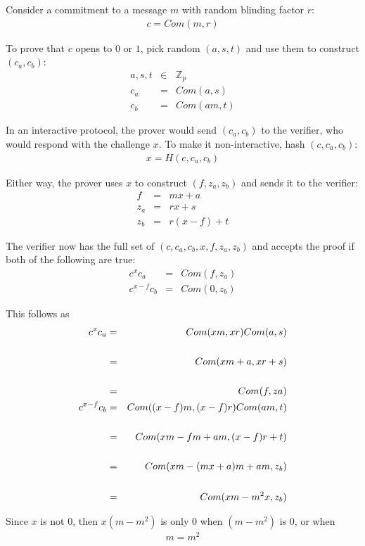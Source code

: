 \documentclass{article}
\begin{document}
Consider a commitment to a message $m$ with random blinding factor $r$:
\begin{eqnarray}
  c=Com(m, r)
\end{eqnarray}

To prove that $c$ opens to $0$ or $1$, pick random $(a,s,t)$ and use them to construct $(c_a, c_b)$:
\begin{eqnarray}
  a,s,t &\in& \mathbb{Z}_p\\
  c_a &=& Com(a, s)\\
  c_b &=& Com(am, t)
\end{eqnarray}

In an interactive protocol, the prover would send $(c_a,c_b)$ to the verifier, who would respond with the challenge $x$.  To make it non-interactive, hash $(c, c_a, c_b)$:
\begin{eqnarray}
  x = H(c, c_a, c_b)
\end{eqnarray}

Either way, the prover uses $x$ to construct $(f, z_a, z_b)$ and sends it to the verifier:
\begin{eqnarray}
  f &=& mx + a\\
  z_a &=& rx + s\\
  z_b &=& r(x-f) + t
\end{eqnarray}

The verifier now has the full set of $(c, c_a, c_b, x, f, z_a, z_b)$ and accepts the proof if both of the following are true:
\begin{eqnarray}
  c^x c_a &=& Com(f, z_a)\\
  c^{x-f} c_b &=& Com(0, z_b)
\end{eqnarray}

This follows as 
\begin{eqnarray}
  c^x c_a &=& Com(xm,xr) Com(a,s)\\
  \cr &=& Com(xm+a, xr+s)\\
  \cr &=& Com(f, za)\\
  c^{x-f} c_b &=& Com((x-f)m, (x-f)r) Com(am, t)\\
  \cr &=& Com(xm - fm + am, (x-f)r + t)\\
  \cr &=& Com(xm - (mx + a)m + am, z_b)\\
  \cr &=& Com(xm - m^2 x, z_b)
\end{eqnarray}

Since $x$ is not $0$, then $x (m-m^2)$ is only $0$ when $(m-m^2)$ is $0$, or when
\begin{eqnarray}
  m = m^2
\end{eqnarray}
\end{document}
